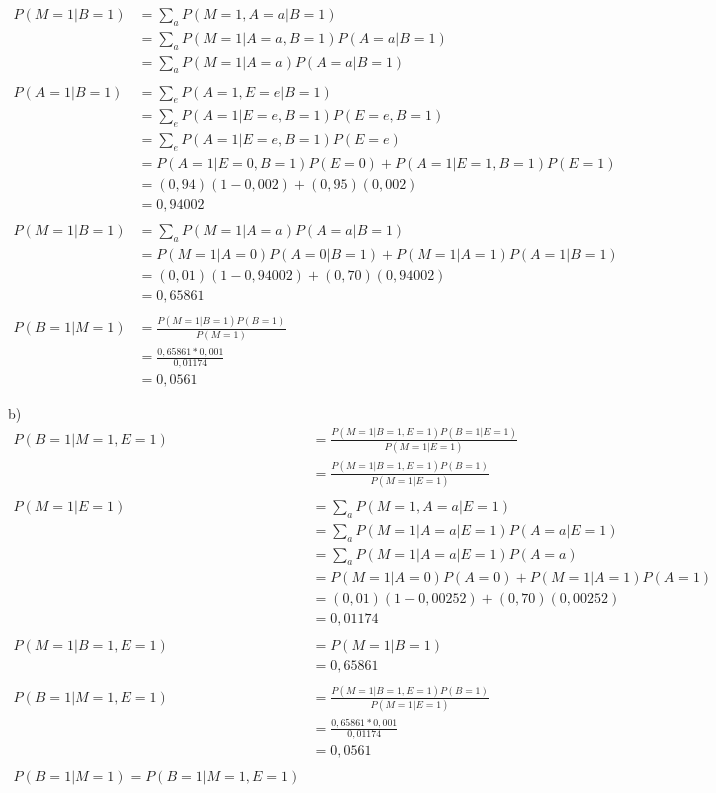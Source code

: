 \documentclass[]{article}
\begin{document}
\begin{align*}
  P(M=1|B=1) & = \sum_{a} P(M=1,A=a|B=1) \\
  &= \sum_{a} P(M=1|A=a,B=1)P(A=a|B=1) \\
  &= \sum_{a} P(M=1|A=a)P(A=a|B=1) \\
  \\
  P(A=1|B=1) & = \sum_{e} P(A=1,E=e|B=1) \\
  &= \sum_{e} P(A=1|E=e,B=1)P(E=e,B=1) \\
  &= \sum_{e} P(A=1|E=e,B=1)P(E=e) \\
  &= P(A=1|E=0,B=1)P(E=0) + P(A=1|E=1,B=1)P(E=1) \\
  &= (0,94)(1-0,002) + (0,95)(0,002) \\
  &= 0,94002 \\
  \\
  P(M=1|B=1) & = \sum_{a} P(M=1|A=a)P(A=a|B=1) \\
  &= P(M=1|A=0)P(A=0|B=1) + P(M=1|A=1)P(A=1|B=1) \\
  &= (0,01)(1-0,94002) + (0,70)(0,94002) \\
  &= 0,65861 \\
  \\
  P(B=1|M=1) & = \frac{P(M=1|B=1)P(B=1)}{P(M=1)} \\
  &= \frac{0,65861*0,001}{0,01174} \\
  &= 0,0561
\end{align*}

b)
\begin{align*}
  P(B=1|M=1,E=1) & = \frac{P(M=1|B=1,E=1)P(B=1|E=1)}{P(M=1|E=1)} \\
  &= \frac{P(M=1|B=1,E=1)P(B=1)}{P(M=1|E=1)} \\
  \\
  P(M=1|E=1) & = \sum_{a} P(M=1,A=a|E=1) \\
  &= \sum_{a} P(M=1|A=a|E=1)P(A=a|E=1) \\
  &= \sum_{a} P(M=1|A=a|E=1)P(A=a) \\
  &= P(M=1|A=0)P(A=0) + P(M=1|A=1)P(A=1) \\
  &= (0,01)(1-0,00252) + (0,70)(0,00252) \\
  &= 0,01174 \\
  \\
  P(M=1|B=1,E=1) & = P(M=1|B=1) \\
  &= 0,65861 \\
  \\
  P(B=1|M=1,E=1) & = \frac{P(M=1|B=1,E=1)P(B=1)}{P(M=1|E=1)} \\
  &= \frac{0,65861*0,001}{0,01174} \\
  &= 0,0561 \\
  \\
  P(B=1|M=1) = P(B=1|M=1,E=1)
\end{align*}
\end{document}
